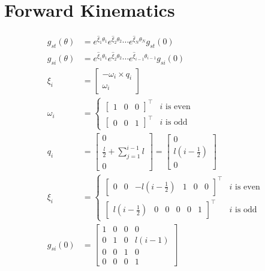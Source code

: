 \documentclass[11pt]{article}
\begin{document}
\section{Forward Kinematics}
\begin{align*}
    g_{st}(\theta) &= e^{\hat{\xi}_1 \theta_1} e^{\hat{\xi}_2 \theta_2} \cdots e^{\hat{\xi}_N \theta_N} g_{st}(0) \\
    g_{si}(\theta) &= e^{\hat{\xi}_1 \theta_1} e^{\hat{\xi}_2 \theta_2} \cdots e^{\hat{\xi}_{i-1} \theta_{i-1}} g_{si}(0) \\
    \xi_i &= \begin{bmatrix}
        -\omega_i \times q_i \\
        \omega_i
    \end{bmatrix} \\
    \omega_i &= \begin{cases}
        \begin{bmatrix}
            1 & 0 & 0
        \end{bmatrix}^\top & i \text{ is even} \\
        \begin{bmatrix}
            0 & 0 & 1
        \end{bmatrix}^\top & i \text{ is odd}
    \end{cases} \\
    q_i &= \begin{bmatrix}
        0 \\ \frac{l}{2} + \sum_{j=1}^{i-1} l \\ 0
    \end{bmatrix} = \begin{bmatrix}
        0 \\ l(i - \frac{1}{2}) \\ 0
    \end{bmatrix} \\
    \xi_i &= \begin{cases}
        \begin{bmatrix}
            0 & 0 & -l(i-\frac{1}{2}) & 1 & 0 & 0
        \end{bmatrix}^\top & i \text{ is even} \\
        \begin{bmatrix}
            l(i-\frac{1}{2}) & 0 & 0 & 0 & 0 & 1
        \end{bmatrix}^\top & i \text{ is odd}
    \end{cases} \\
    g_{si}(0) &= \begin{bmatrix}
        1 & 0 & 0 & 0 \\
        0 & 1 & 0 & l(i-1) \\
        0 & 0 & 1 & 0 \\
        0 & 0 & 0 & 1
    \end{bmatrix}
\end{align*}
\end{document}

